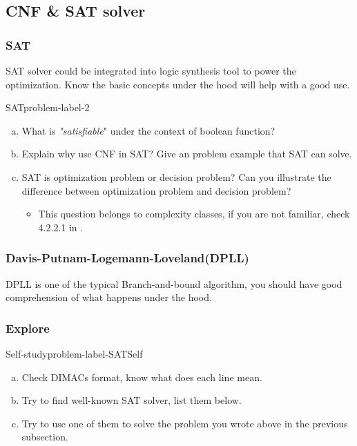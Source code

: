 \documentclass[main.tex]{subfiles}
\begin{document}
\subsection{CNF \& SAT solver}
\subsubsection{SAT}
SAT solver could be integrated into logic synthesis tool to power the optimization. Know the basic concepts under the hood will help with a good use.
\begin{problem}{SAT}{problem-label-2}
\begin{enumerate}[(a)]
    \item What is \textit{"satisfiable}" under the context of boolean function?
    \item Explain why use CNF in SAT? Give an problem example that SAT can solve.
    \item SAT is optimization problem or decision problem? Can you illustrate the difference between optimization problem and decision problem?
    \begin{itemize}
        \item This question belongs to complexity classes, if you are not familiar, check 4.2.2.1 in \cite{EDA2009}.
    \end{itemize} 
\end{enumerate}
\end{problem}
\vspace*{4\baselineskip}

\subsubsection{Davis-Putnam-Logemann-Loveland(DPLL)}
DPLL is one of the typical Branch-and-bound algorithm, you should have good comprehension of what happens under the hood.

\subsubsection{Explore}
\begin{problem}{Self-study}{problem-label-SATSelf}
\begin{enumerate}[(a)]
    \item Check DIMACs format, know what does each line mean.
    \item Try to find well-known SAT solver, list them below.
    \item Try to use one of them to solve the problem you wrote above in the previous subsection.
\end{enumerate}
\end{problem}
\end{document}
